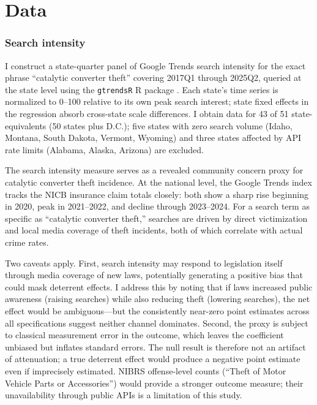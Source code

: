 \documentclass[12pt]{article}
\begin{document}
\section{Data}

\subsubsection*{Search intensity} I construct a state-quarter panel of Google Trends search intensity for the exact phrase ``catalytic converter theft'' covering 2017Q1 through 2025Q2, queried at the state level using the \texttt{gtrendsR} R package \citep{googletrends}. Each state's time series is normalized to 0--100 relative to its own peak search interest; state fixed effects in the regression absorb cross-state scale differences. I obtain data for 43 of 51 state-equivalents (50 states plus D.C.); five states with zero search volume (Idaho, Montana, South Dakota, Vermont, Wyoming) and three states affected by API rate limits (Alabama, Alaska, Arizona) are excluded.

The search intensity measure serves as a revealed community concern proxy for catalytic converter theft incidence. At the national level, the Google Trends index tracks the NICB insurance claim totals closely: both show a sharp rise beginning in 2020, peak in 2021--2022, and decline through 2023--2024. For a search term as specific as ``catalytic converter theft,'' searches are driven by direct victimization and local media coverage of theft incidents, both of which correlate with actual crime rates.

Two caveats apply. First, search intensity may respond to legislation itself through media coverage of new laws, potentially generating a positive bias that could mask deterrent effects. I address this by noting that if laws increased public awareness (raising searches) while also reducing theft (lowering searches), the net effect would be ambiguous---but the consistently near-zero point estimates across all specifications suggest neither channel dominates. Second, the proxy is subject to classical measurement error in the outcome, which leaves the coefficient unbiased but inflates standard errors. The null result is therefore not an artifact of attenuation; a true deterrent effect would produce a negative point estimate even if imprecisely estimated. NIBRS offense-level counts (``Theft of Motor Vehicle Parts or Accessories'') would provide a stronger outcome measure; their unavailability through public APIs is a limitation of this study.
\end{document}
